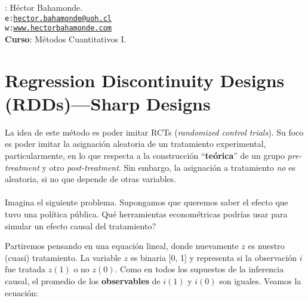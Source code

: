 \documentclass[10pt]{article}
\begin{document}


\thispagestyle{fancy} %





\hspace{-5mm}{\bf Profesor}: H\'ector Bahamonde.\\
\texttt{e:}\href{mailto:hector.bahamonde@uoh.cl}{\texttt{hector.bahamonde@uoh.cl}}\\
\texttt{w:}\href{http://www.hectorbahamonde.com}{\texttt{www.hectorbahamonde.com}}\\
{\bf Curso}: M\'etodos Cuantitativos I.

\section*{Regression Discontinuity Designs (RDDs)---Sharp Designs}

La idea de este m\'etodo es poder imitar RCTs (\emph{randomized control trials}). Su foco es poder imitar la asignaci\'on aleatoria de un tratamiento experimental, particularmente, en lo que respecta a la construcci\'on ``{\bf te\'orica}'' de un grupo \emph{pre-treatment} y otro \emph{post-treatment}. Sin embargo, la asignaci\'on a tratamiento \emph{no} es aleatoria, si no que depende de otras variables.
\\
\\
Imagina el siguiente problema. Supongamos que queremos saber el efecto que tuvo una pol\'itica p\'ublica. Qu\'e herramientas econom\'etricas podr\'ias usar para simular un efecto causal del tratamiento?

Partiremos pensando en una equaci\'on lineal, donde nuevamente $z$ es nuestro (cuasi) tratamiento. La variable $z$ es binaria [0, 1] y representa si la observaci\'on $i$ fue tratada $z(1)$ o no $z(0)$. Como en todos los supuestos de la inferencia causal, el promedio de los {\bf observables} de $i(1)$ y $i(0)$ son iguales. Veamos la ecuaci\'on:
\end{document}

